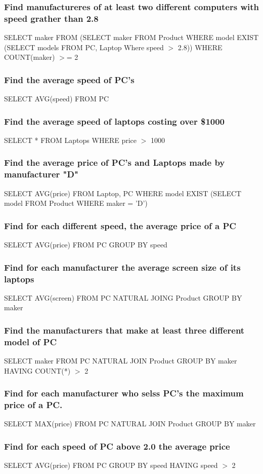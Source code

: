 \documentclass[12pt, a4paper]{article}
\begin{document}
			\subsubsection{Find manufactureres of at least two different computers with speed grather than 2.8}
				SELECT maker FROM (SELECT maker FROM Product WHERE model EXIST (SELECT models FROM PC, Laptop Where speed $>$ 2.8)) WHERE COUNT(maker) $>$= 2		
			\subsubsection{Find the average speed of PC's}
				SELECT AVG(speed) FROM PC
			\subsubsection{Find the average speed of laptops costing over \$1000}
				SELECT * FROM Laptops WHERE price $>$ 1000
			\subsubsection{Find the average price of PC's and Laptops made by manufacturer "D"}
				SELECT AVG(price) FROM Laptop, PC WHERE model EXIST (SELECT model FROM Product WHERE maker = 'D')
			\subsubsection{Find for each different speed, the average price of a PC}
				SELECT AVG(price) FROM PC GROUP BY speed
			\subsubsection{Find for each manufacturer the average screen size of its laptops}
				SELECT AVG(screen) FROM PC NATURAL JOING Product GROUP BY maker
			\subsubsection{Find the manufacturers that make at least three different model of PC}
				SELECT maker FROM PC NATURAL JOIN Product GROUP BY maker HAVING COUNT(*) $>$ 2
			\subsubsection{Find for each manufacturer who selss PC's the maximum price of a PC.}
				SELECT MAX(price) FROM PC NATURAL JOIN Product GROUP BY maker
			\subsubsection{Find for each speed of PC above 2.0 the average price}
				SELECT AVG(price) FROM PC GROUP BY speed HAVING speed $>$ 2
		
\end{document}
